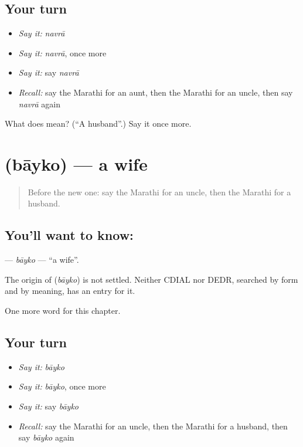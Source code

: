 \subsection*{Your turn}
\begin{itemize}
\raggedright
  \item \emph{Say it:} \emph{navrā}
  \item \emph{Say it:} \emph{navrā}, once more
  \item \emph{Say it:} say \emph{navrā}
  \item \emph{Recall:} say the Marathi for an aunt, then the Marathi for an uncle, then say \emph{navrā} again
\end{itemize}

\begin{tcolorbox}[breakable,colback=teal!4,colframe=teal!35!black,title={Before you move on}]
What does  mean? (\textquotedblleft{}A husband\textquotedblright{}.) Say it once more.
\end{tcolorbox}
\section[\texorpdfstring{\mr{बायको} (bāyko)}{बायको (bāyko)}]{ (bāyko) — a wife}

\label{lesson:MR-C76-bayko}



\begin{quote}
Before the new one: say the Marathi for an uncle, then the Marathi for a husband.
\end{quote}

\subsection*{You'll want to know: }
\textbf{} — \emph{bāyko} — \textquotedblleft{}a wife\textquotedblright{}.

\begin{cousinweb}
The origin of \textbf{} (\emph{bāyko}) is not settled. Neither CDIAL nor DEDR, searched by form and by meaning, has an entry for it.
\end{cousinweb}

\begin{grammarlens}[title={What you've built}]
One more word for this chapter.
\end{grammarlens}

\subsection*{Your turn}
\begin{itemize}
\raggedright
  \item \emph{Say it:} \emph{bāyko}
  \item \emph{Say it:} \emph{bāyko}, once more
  \item \emph{Say it:} say \emph{bāyko}
  \item \emph{Recall:} say the Marathi for an uncle, then the Marathi for a husband, then say \emph{bāyko} again
\end{itemize}

